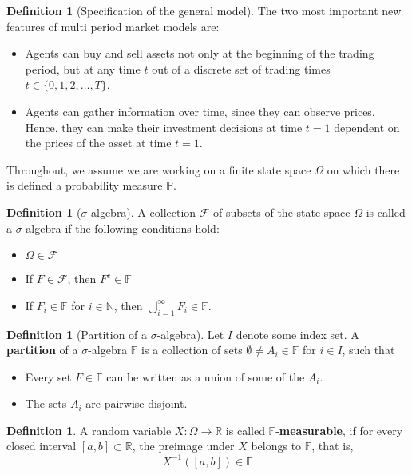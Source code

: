 \documentclass[10pt, oneside, reqno]{amsart}
\theoremstyle{plain}%
\theoremstyle{definition}
\newtheorem{defn}[thm]{Definition}
\theoremstyle{remark}
\newcommand{\R}{\mathbb{R}}
\newcommand{\F}{\mathbb{F}}
\begin{document}
\begin{defn}[Specification of the general model]
    The two most important new features of multi period market models are:
    \begin{itemize}
        \item Agents can buy and sell assets not only at the beginning of the trading period, but at any time $t$ out of a discrete set of trading times $t \in \{0,1,2,\dots,T \}$.
        \item Agents can gather information over time, since they can observe prices.  Hence, they can make their investment decisions at time $t=1$ dependent on the prices of the asset at time $t=1$.
    \end{itemize}
\end{defn}

Throughout, we assume we are working on a finite state space $\Omega$ on which there is defined a probability measure $\mathbb{P}$.

\begin{defn}[$\sigma$-algebra]
    A collection $\mathcal{F}$ of subsets of the state space $\Omega$ is called a $\sigma$-algebra if the following conditions hold:
    \begin{itemize}
        \item $\Omega \in \mathcal{F}$
        \item If $F \in \mathcal{F}$, then $F^c \in \F$
        \item If $F_i \in \F$ for $i \in \mathbb{N}$, then $\bigcup_{i=1}^\infty F_i \in \F$.
    \end{itemize}
\end{defn}

\begin{defn}[Partition of a $\sigma$-algebra]
    Let $I$ denote some index set.  A \textbf{partition} of a $\sigma$-algebra $\F$ is a collection of sets $\emptyset \neq A_i \in \F$ for $i \in I$, such that 
    \begin{itemize}
        \item Every set $F \in \F$ can be written as a union of some of the $A_i$.
        \item The sets $A_i$ are pairwise disjoint.
    \end{itemize}
\end{defn}

\begin{defn}
    A random variable $X : \Omega \rightarrow \R$ is called $\F$-\textbf{measurable}, if for every closed interval $[a,b] \subset \R$, the preimage under $X$ belongs to $\F$, that is,
    \[
        X^{-1}([a,b]) \in \F
    \]
\end{defn}
\end{document}
